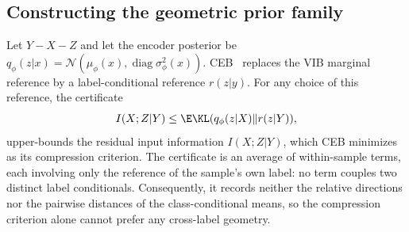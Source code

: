 \subsection{Constructing the geometric prior family}

Let $Y-X-Z$ and let the encoder posterior be
$q_\phi(z|x)=\mathcal N(\mu_\phi(x),\operatorname{diag}\sigma_\phi^2(x))$.
CEB~\citep{fischer2020conditional} replaces the VIB marginal reference by a
label-conditional reference $r(z|y)$. For any choice of this reference, the
certificate
\begin{equation}
I(X;Z|Y)\le\E\KL(q_\phi(z|X)\|r(z|Y)),
\label{eq:gap}
\end{equation}
upper-bounds the residual input information $I(X;Z|Y)$, which CEB minimizes as its
compression criterion. The certificate is an average of within-sample terms, each
involving only the reference of the sample's own label: no term couples two
distinct label conditionals. Consequently, it records neither the relative
directions nor the pairwise distances of the class-conditional means, so the
compression criterion alone cannot prefer any cross-label geometry.

